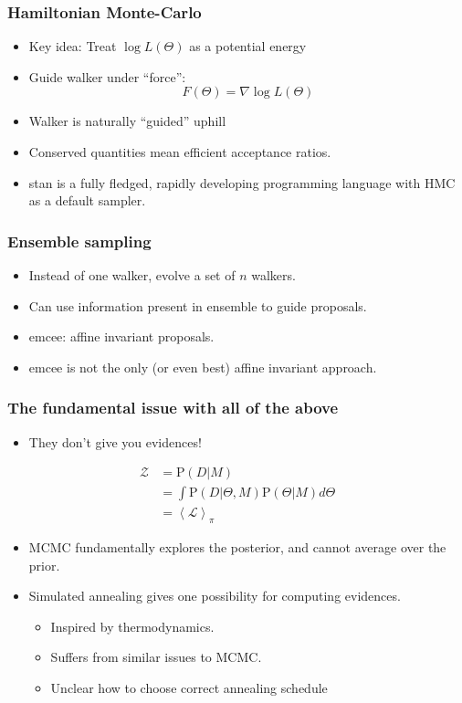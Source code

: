 \documentclass[%
]{beamer}
\newcommand{\lik}{\mathcal{L}}
\newcommand{\prior}{\pi}
\newcommand{\ev}{\mathcal{Z}}
\newcommand{\prob}{\mathrm{P}}
\begin{document}
\begin{frame}
  \frametitle{Hamiltonian Monte-Carlo} 
  \begin{itemize}
      \item Key idea: Treat $\log L(\Theta)$ as a potential energy
      \item Guide walker under ``force'': \[F(\Theta) =\nabla \log L(\Theta)\]
      \item Walker is naturally ``guided'' uphill
      \item Conserved quantities mean efficient acceptance ratios.
      \item stan is a fully fledged, rapidly developing programming language with HMC as a default sampler.
  \end{itemize}
\end{frame}


\begin{frame}
  \frametitle{Ensemble sampling} 
  \begin{itemize}
      \item Instead of one walker, evolve a set of $n$ walkers.
      \item Can use information present in ensemble to guide proposals.
      \item emcee: affine invariant proposals.
      \item emcee is not the only (or even best) affine invariant approach.
  \end{itemize}
\end{frame}

\begin{frame}
  \frametitle{The fundamental issue with all of the above} 

  \begin{itemize}
    \item They don't give you evidences!
  \end{itemize}

  \begin{align}
    \ev 
    &= \prob(D|M) 
    \nonumber\\
    &= \int\prob(D|\Theta,M)\prob(\Theta|M) d\Theta 
    \nonumber\\
    &= \left\langle \lik \right\rangle_\prior
    \nonumber
  \end{align}
  
  \begin{itemize}
    \item MCMC fundamentally explores the posterior, and cannot average over the prior.
    \item Simulated annealing gives one possibility for computing evidences.
    \begin{itemize}
        \item Inspired by thermodynamics.
        \item Suffers from similar issues to MCMC.
        \item Unclear how to choose correct annealing schedule
    \end{itemize}
  \end{itemize}
 
\end{frame}
\end{document}
